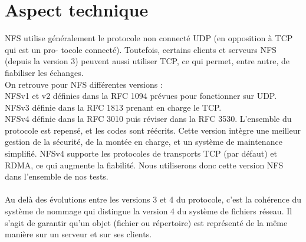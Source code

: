 \documentclass[12pt]{report}
\begin{document}
		\section{Aspect technique}
		
		NFS utilise généralement le protocole non connecté UDP (en opposition à TCP qui est un pro-
    tocole connecté). Toutefois, certains clients et serveurs NFS (depuis la version 3) peuvent aussi
    utiliser TCP, ce qui permet, entre autre, de fiabiliser les échanges.\\

    On retrouve pour NFS différentes versions :\\
    NFSv1 et v2 définies dans la RFC 1094 prévues pour fonctionner sur UDP.\\
    NFSv3 définie dans la RFC 1813 prenant en charge le TCP.\\
    NFSv4 définie dans la RFC 3010 puis réviser dans la RFC 3530. L'ensemble du protocole est repensé, et les codes sont réécrits.
    Cette version intègre une meilleur gestion de la sécurité, de la montée en charge, et un système de maintenance simplifié.
    NFSv4 supporte les protocoles de transports TCP (par défaut) et RDMA, ce qui augmente la fiabilité. Nous utiliserons donc cette version NFS dans l'ensemble de nos tests.\\\\
Au delà des évolutions entre les versions 3 et 4 du protocole, c'est la cohérence du système de nommage qui distingue la version 4 du système de fichiers réseau. Il s'agit de garantir qu'un objet (fichier ou répertoire) est représenté de la même manière sur un serveur et sur ses clients.
\newpage
\end{document}
